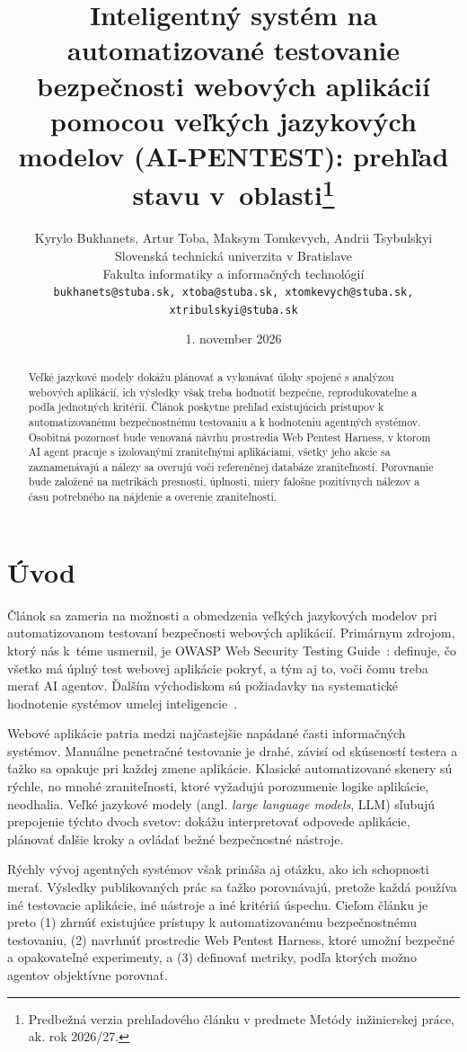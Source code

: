 \documentclass[10pt,twoside,slovak,a4paper]{article}
\title{Inteligentný systém na automatizované testovanie bezpečnosti webových aplikácií pomocou veľkých jazykových modelov (AI-PENTEST): prehľad stavu v~oblasti\thanks{Predbežná verzia prehľadového článku v predmete Metódy inžinierskej práce, ak. rok 2026/27.}}
\author{
Kyrylo Bukhanets, Artur Toba, Maksym Tomkevych, Andrii Tsybulskyi\\[2pt]
{\small Slovenská technická univerzita v Bratislave}\\
{\small Fakulta informatiky a informačných technológií}\\
{\small \texttt{bukhanets@stuba.sk, xtoba@stuba.sk, xtomkevych@stuba.sk, xtribulskyi@stuba.sk}}
}
\date{\small 1. november 2026}
\begin{document}
\maketitle

\begin{abstract}
Veľké jazykové modely dokážu plánovať a vykonávať úlohy spojené s analýzou webových aplikácií, ich výsledky však treba hodnotiť bezpečne, reprodukovateľne a podľa jednotných kritérií. Článok poskytne prehľad existujúcich prístupov k automatizovanému bezpečnostnému testovaniu a k hodnoteniu agentných systémov. Osobitná pozornosť bude venovaná návrhu prostredia Web Pentest Harness, v ktorom AI agent pracuje s izolovanými zraniteľnými aplikáciami, všetky jeho akcie sa zaznamenávajú a nálezy sa overujú voči referenčnej databáze zraniteľností. Porovnanie bude založené na metrikách presnosti, úplnosti, miery falošne pozitívnych nálezov a času potrebného na nájdenie a overenie zraniteľnosti.
\end{abstract}

\section{Úvod}\label{uvod}
Článok sa zameria na možnosti a obmedzenia veľkých jazykových modelov pri automatizovanom testovaní bezpečnosti webových aplikácií. Primárnym zdrojom, ktorý nás k~téme usmernil, je OWASP Web Security Testing Guide~\cite{OWASP-WSTG}: definuje, čo všetko má úplný test webovej aplikácie pokryť, a tým aj to, voči čomu treba merať AI agentov. Ďalším východiskom sú požiadavky na systematické hodnotenie systémov umelej inteligencie~\cite{NIST-AIME,NIST-ARIA}.

Webové aplikácie patria medzi najčastejšie napádané časti informačných systémov. Manuálne penetračné testovanie je drahé, závisí od skúseností testera a ťažko sa opakuje pri každej zmene aplikácie. Klasické automatizované skenery sú rýchle, no mnohé zraniteľnosti, ktoré vyžadujú porozumenie logike aplikácie, neodhalia. Veľké jazykové modely (angl. \emph{large language models}, LLM) sľubujú prepojenie týchto dvoch svetov: dokážu interpretovať odpovede aplikácie, plánovať ďalšie kroky a ovládať bežné bezpečnostné nástroje.

Rýchly vývoj agentných systémov však prináša aj otázku, ako ich schopnosti merať. Výsledky publikovaných prác sa ťažko porovnávajú, pretože každá používa iné testovacie aplikácie, iné nástroje a iné kritériá úspechu. Cieľom článku je preto (1) zhrnúť existujúce prístupy k automatizovanému bezpečnostnému testovaniu, (2) navrhnúť prostredie Web Pentest Harness, ktoré umožní bezpečné a opakovateľné experimenty, a (3) definovať metriky, podľa ktorých možno agentov objektívne porovnať.
\end{document}
